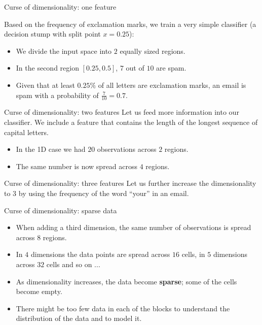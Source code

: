 \documentclass[11pt,compress,t,notes=noshow, xcolor=table]{beamer}
\begin{document}
\begin{framev}{Curse of dimensionality: one feature}

Based on the frequency of exclamation marks, we train a very simple classifier (a decision stump with split point $x = 0.25$):

\begin{itemize}
\item We divide the input space into $2$ equally sized regions.
\item In the second region $[0.25, 0.5]$, $7$ out of $10$ are spam.
\item Given that at least $0.25\%$ of all letters are exclamation marks, an email is spam with a probability of $\frac{7}{10} = 0.7$.
\end{itemize}
\end{framev}

\begin{framev}{Curse of dimensionality: two features}
Let us feed more information into our classifier. We include a feature that contains the length of the longest sequence of capital letters.

\vfill


\begin{itemize}
\item In the 1D case we had $20$ observations across $2$ regions.
\item The same number is now spread across $4$ regions.
\end{itemize}
\end{framev}

\begin{framev}{Curse of dimensionality: three features}
Let us further increase the dimensionality to 3 by using the frequency of the word \enquote{your} in an email.

\vfill

\end{framev}

\begin{framev}{Curse of dimensionality: sparse data}
\begin{itemize}
\item When adding a third dimension, the same number of observations is spread across $8$ regions.
\item In $4$ dimensions the data points are spread across $16$ cells, in $5$ dimensions across $32$ cells and so on ...
\item As dimensionality increases, the data become \textbf{sparse}; some of the cells become empty.
\item There might be too few data in each of the blocks to understand the distribution of the data and to model it.
\end{itemize}

\vfill

\end{framev}
\end{document}
